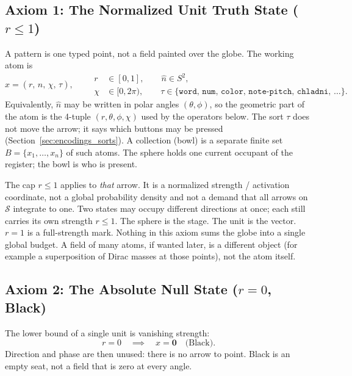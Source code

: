 \documentclass[12pt, a4paper]{article}
\begin{document}
\subsection{Axiom 1: The Normalized Unit Truth State ($r \le 1$)}
\label{subsec:axiom1}
A pattern is one typed point, not a field painted over the globe. The working atom is
\begin{equation}
    x = (r,\,\hat n,\,\chi,\,\tau),
    \qquad
    \begin{aligned}
    r &\in [0,1],
    \qquad
    \hat n \in S^2,\\
    \chi &\in [0,2\pi),
    \qquad
    \tau \in \{\mathtt{word},\,\mathtt{num},\,\mathtt{color},\,\mathtt{note\text{-}pitch},\,\mathtt{chladni},\,\ldots\}.
    \end{aligned}
    \label{eq:unit_truth}
\end{equation}
Equivalently, $\hat n$ may be written in polar angles $(\theta,\phi)$, so the geometric part of the atom is the 4-tuple $(r,\theta,\phi,\chi)$ used by the operators below. The sort $\tau$ does not move the arrow; it says which buttons may be pressed (Section~\ref{sec:encodings_sorts}). A collection (bowl) is a separate finite set $B=\{x_1,\ldots,x_n\}$ of such atoms. The sphere holds one current occupant of the register; the bowl is who is present.

The cap $r \le 1$ applies to \emph{that} arrow. It is a normalized strength / activation coordinate, not a global probability density and not a demand that all arrows on $\mathcal{S}$ integrate to one. Two states may occupy
different directions at once; each still carries its own strength
$r\le 1$. The sphere is the stage. The unit is the vector.
$r=1$ is a full-strength mark. Nothing in this axiom sums the globe
into a single global budget. A field of many atoms, if wanted later, is a different object (for example a superposition of Dirac masses at those points), not the atom itself.

\subsection{Axiom 2: The Absolute Null State ($r = 0$, Black)}
\label{subsec:axiom_null}
The lower bound of a single unit is vanishing strength:
\begin{equation}
    r = 0 \quad \implies \quad x = \mathbf{0}
    \quad \text{(Black)}.
    \label{eq:null_state}
\end{equation}
Direction and phase are then unused: there is no arrow to point.
Black is an empty seat, not a field that is zero at every angle.
\end{document}
